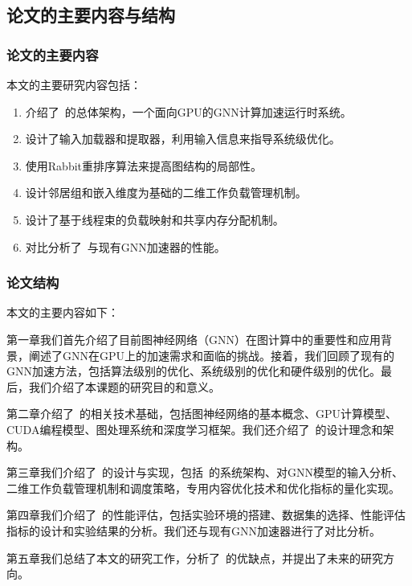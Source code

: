 \subsection{论文的主要内容与结构}
\subsubsection{论文的主要内容}

本文的主要研究内容包括：
\begin{enumerate}[label=\arabic*), leftmargin=3em]
    \item 介绍了~\Mname{}的总体架构，一个面向GPU的GNN计算加速运行时系统。
    \item 设计了输入加载器和提取器，利用输入信息来指导系统级优化。
    \item 使用Rabbit重排序算法来提高图结构的局部性。
    \item 设计邻居组和嵌入维度为基础的二维工作负载管理机制。
    \item 设计了基于线程束的负载映射和共享内存分配机制。
    \item 对比分析了~\Mname{}与现有GNN加速器的性能。
\end{enumerate}
\subsubsection{论文结构}
本文的主要内容如下：

第一章我们首先介绍了目前图神经网络（GNN）在图计算中的重要性和应用背景，阐述了GNN在GPU上的加速需求和面临的挑战。接着，我们回顾了现有的GNN加速方法，包括算法级别的优化、系统级别的优化和硬件级别的优化。最后，我们介绍了本课题的研究目的和意义。

第二章介绍了~\Mname{}的相关技术基础，包括图神经网络的基本概念、GPU计算模型、CUDA编程模型、图处理系统和深度学习框架。我们还介绍了~\Mname{}的设计理念和架构。

第三章我们介绍了~\Mname{}的设计与实现，包括~\Mname{}的系统架构、对GNN模型的输入分析、二维工作负载管理机制和调度策略，专用内容优化技术和优化指标的量化实现。

第四章我们介绍了~\Mname{}的性能评估，包括实验环境的搭建、数据集的选择、性能评估指标的设计和实验结果的分析。我们还与现有GNN加速器进行了对比分析。

第五章我们总结了本文的研究工作，分析了~\Mname{}的优缺点，并提出了未来的研究方向。







